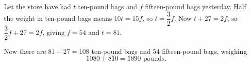 Let the store have had $t$ ten-pound bags and $f$ fifteen-pound bags yesterday. Half the weight in ten-pound bags means $10t=15f$, so $t=\dfrac{3}{2}f$. Now $t+27=2f$, so $\dfrac{3}{2}f+27=2f$, giving $f=54$ and $t=81$.

Now there are $81+27=108$ ten-pound bags and $54$ fifteen-pound bags, weighing
\[1080+810=\boxed{1890}\text{ pounds}.\]
